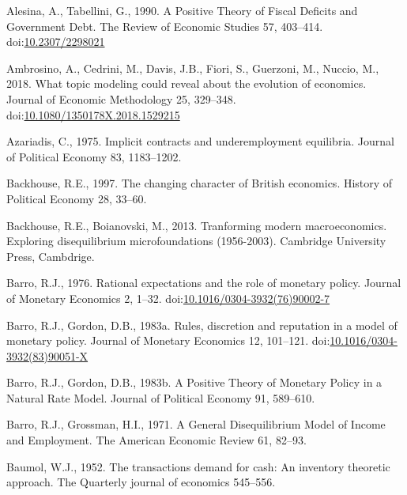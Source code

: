 \documentclass[
  12pt,
  onecolumn]{article}
\newlength{\cslhangindent}
\newlength{\cslentryspacingunit} %
\newenvironment{CSLReferences}[2] %
 {%
  \setlength{\parindent}{0pt}
  \ifodd #1
  \let\oldpar\par
  \def\par{\hangindent=\cslhangindent\oldpar}
  \fi
  \setlength{\parskip}{#2\cslentryspacingunit}
 }%
 {}
\begin{document}
\hypertarget{refs}{}
\begin{CSLReferences}{1}{0}
\leavevmode{}%
Alesina, A., Tabellini, G., 1990. A {Positive Theory} of {Fiscal
Deficits} and {Government Debt}. The Review of Economic Studies 57,
403--414. doi:\href{https://doi.org/10.2307/2298021}{10.2307/2298021}

\leavevmode{}%
Ambrosino, A., Cedrini, M., Davis, J.B., Fiori, S., Guerzoni, M.,
Nuccio, M., 2018. What topic modeling could reveal about the evolution
of economics. Journal of Economic Methodology 25, 329--348.
doi:\href{https://doi.org/10.1080/1350178X.2018.1529215}{10.1080/1350178X.2018.1529215}

\leavevmode{}%
Azariadis, C., 1975. Implicit contracts and underemployment equilibria.
Journal of Political Economy 83, 1183--1202.

\leavevmode{}%
Backhouse, R.E., 1997. The changing character of {British} economics.
History of Political Economy 28, 33--60.

\leavevmode{}%
Backhouse, R.E., Boianovski, M., 2013. Tranforming modern
macroeconomics. {Exploring} disequilibrium microfoundations (1956-2003).
{Cambridge University Press}, {Cambdrige}.

\leavevmode{}%
Barro, R.J., 1976. Rational expectations and the role of monetary
policy. Journal of Monetary Economics 2, 1--32.
doi:\href{https://doi.org/10.1016/0304-3932(76)90002-7}{10.1016/0304-3932(76)90002-7}

\leavevmode{}%
Barro, R.J., Gordon, D.B., 1983a. Rules, discretion and reputation in a
model of monetary policy. Journal of Monetary Economics 12, 101--121.
doi:\href{https://doi.org/10.1016/0304-3932(83)90051-X}{10.1016/0304-3932(83)90051-X}

\leavevmode{}%
Barro, R.J., Gordon, D.B., 1983b. A {Positive Theory} of {Monetary
Policy} in a {Natural Rate Model}. Journal of Political Economy 91,
589--610.

\leavevmode{}%
Barro, R.J., Grossman, H.I., 1971. A {General Disequilibrium Model} of
{Income} and {Employment}. The American Economic Review 61, 82--93.

\leavevmode{}%
Baumol, W.J., 1952. The transactions demand for cash: {An} inventory
theoretic approach. The Quarterly journal of economics 545--556.


\end{CSLReferences}
\end{document}
